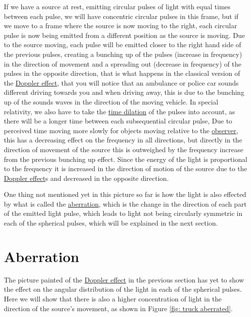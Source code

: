 If we have a source at rest, emitting circular pulses of light with equal times between each pulse, we will have concentric circular pulses in this frame, but if we move to a frame where the source is now moving to the right, each circular pulse is now being emitted from a different position as the source is moving. Due to the source moving, each pulse will be emitted closer to the right hand side of the previous pulses, creating a bunching up of the pulses (increase in frequency) in the direction of movement and a spreading out (decrease in frequency) of the pulses in the opposite direction, that is what happens in the classical version of the \hyperlink{def-doppler-effect}{Doppler effect}, that you will notice that an ambulance or police car sounds different driving towards you and when driving away, this is due to the bunching up of the sounds waves in the direction of the moving vehicle. In special relativity, we also have to take the \hyperlink{def-time-dilation}{time dilation} of the pulses into account, as there will be a longer time between each subsequential circular pulse, Due to perceived time moving more slowly for objects moving relative to the \hyperlink{def-observer}{observer}, this has a decreasing effect on the frequency in all directions, but directly in the direction of movement of the source this is outweighed by the frequency increase from the previous bunching up effect. Since the energy of the light is proportional to the frequency it is increased in the direction of motion of the source due to the \hyperlink{def-doppler-effect}{Doppler effect}s and decreased in the opposite direction.

One thing not mentioned yet in this picture so far is how the light is also effected by what is called the \hyperlink{def-aberration}{aberration}, which is the change in the direction of each part of the emitted light pulse, which leads to light not being circularly symmetric in each of the spherical pulses, which will be explained in the next section.

\section{Aberration}

The picture painted of the \hyperlink{def-doppler-effect}{Doppler effect} in the previous section has yet to show the effect on the angular distribution of the light in each of the spherical pulses. Here we will show that there is also a higher concentration of light in the direction of the source's movement, as shown in Figure \ref{fig: truck aberrated}.



